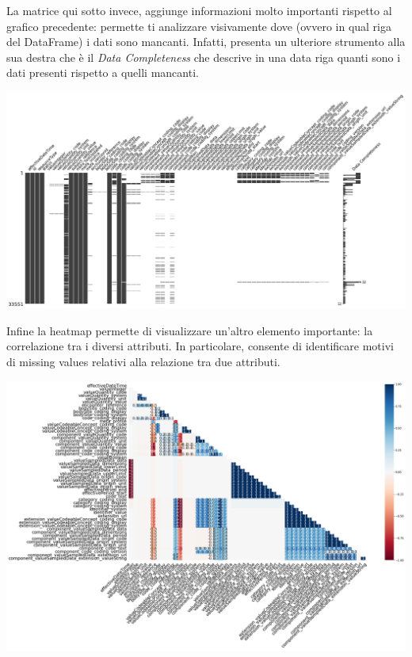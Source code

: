 \documentclass[11pt, oneside]{article}
\begin{document}
La matrice qui sotto invece, aggiunge informazioni molto importanti rispetto al grafico precedente: permette ti analizzare visivamente dove (ovvero in qual riga del DataFrame) i dati sono mancanti. Infatti, presenta un ulteriore strumento alla sua destra che è il \emph{Data Completeness} che descrive in una data riga quanti sono i dati presenti rispetto a quelli mancanti. 

\begin{center}
\includegraphics[scale=0.25]{2_msn_matrix.png}
\end{center}

Infine la heatmap permette di visualizzare un'altro elemento importante: la correlazione tra i diversi attributi. In particolare, consente di identificare motivi di missing values relativi alla relazione tra due attributi.

\begin{center}
\includegraphics[scale=0.25]{2_msn_heatmap.png}
\end{center}
\end{document}

